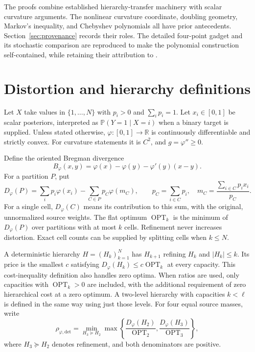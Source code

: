 \documentclass[11pt]{article}
\theoremstyle{definition}\newtheorem{definition}[theorem]{Definition}
\theoremstyle{remark}\newtheorem{remark}[theorem]{Remark}
\newcommand{\ph}{\varphi}
\newcommand{\B}{B_{\ph}}
\newcommand{\D}{D_{\ph}}
\newcommand{\OPT}{\operatorname{OPT}}
\newcommand{\R}{\mathbb R}
\newcommand{\detp}{\mathrm{det}}
\begin{document}
The proofs combine established hierarchy-transfer machinery with scalar curvature arguments. The nonlinear curvature coordinate, doubling geometry, Markov's inequality, and Chebyshev polynomials all have prior antecedents. Section~\ref{sec:provenance} records their roles. The detailed four-point gadget and its stochastic comparison are reproduced to make the polynomial construction self-contained, while retaining their attribution to \cite{huang7}.

\section{Distortion and hierarchy definitions}
\label{sec:definitions}
Let $X$ take values in $\{1,\ldots,N\}$ with $p_i>0$ and $\sum_i p_i=1$. Let $x_i\in[0,1]$ be scalar posteriors, interpreted as $\mathbb P(Y=1\mid X=i)$ when a binary target is supplied. Unless stated otherwise, $\ph:[0,1]\to\R$ is continuously differentiable and strictly convex. For curvature statements it is $C^2$, and $g=\ph''\ge0$.

Define the oriented Bregman divergence
\begin{equation}
\B(x,y)=\ph(x)-\ph(y)-\ph'(y)(x-y).
\label{eq:bregman}
\end{equation}
For a partition $P$, put
\begin{equation}
\D(P)=\sum_i p_i\ph(x_i)-\sum_{C\in P}p_C\ph(m_C),\qquad
p_C=\sum_{i\in C}p_i,\quad m_C=\frac{\sum_{i\in C}p_ix_i}{p_C}.
\label{eq:distortion}
\end{equation}
For a single cell, $\D(C)$ means its contribution to this sum, with the original, unnormalized source weights. The flat optimum $\OPT_k$ is the minimum of $\D(P)$ over partitions with at most $k$ cells. Refinement never increases distortion. Exact cell counts can be supplied by splitting cells when $k\le N$.

A deterministic hierarchy $H=(H_k)_{k=1}^N$ has $H_{k+1}$ refining $H_k$ and $|H_k|\le k$. Its price is the smallest $c$ satisfying $\D(H_k)\le c\OPT_k$ at every capacity. This cost-inequality definition also handles zero optima. When ratios are used, only capacities with $\OPT_k>0$ are included, with the additional requirement of zero hierarchical cost at a zero optimum. A two-level hierarchy with capacities $k<\ell$ is defined in the same way using just those levels. For four equal source masses, write
\begin{equation}
\rho_{\ph,\detp}=\min_{H_3\succeq H_2}\max\left\{
\frac{\D(H_2)}{\OPT_2},\frac{\D(H_3)}{\OPT_3}\right\},
\label{eq:detprice}
\end{equation}
where $H_3\succeq H_2$ denotes refinement, and both denominators are positive.
\end{document}

